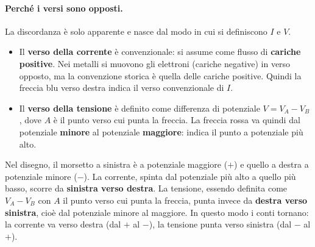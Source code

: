 \begin{figure}[htbp]
\centering
{}
\end{figure}

\paragraph{Perché i versi sono opposti.}
La discordanza è solo apparente e nasce dal modo in cui si definiscono \(I\) e \(V\).

\begin{itemize}[leftmargin=0.5cm]
  \item Il \textbf{verso della corrente} è convenzionale: si assume come flusso di \textbf{cariche positive}. Nei metalli si muovono gli elettroni (cariche negative) in verso opposto, ma la convenzione storica è quella delle cariche positive. Quindi la freccia blu verso destra indica il verso convenzionale di \(I\).
  \item Il \textbf{verso della tensione} è definito come differenza di potenziale \(V = V_A - V_B\), dove \(A\) è il punto verso cui punta la freccia. La freccia rossa va quindi dal potenziale \textbf{minore} al potenziale \textbf{maggiore}: indica il punto a potenziale più alto.
\end{itemize}

Nel disegno, il morsetto a sinistra è a potenziale maggiore (\(+\)) e quello a destra a potenziale minore (\(-\)). La corrente, spinta dal potenziale più alto a quello più basso, scorre da \textbf{sinistra verso destra}. La tensione, essendo definita come \(V_A - V_B\) con \(A\) il punto verso cui punta la freccia, punta invece da \textbf{destra verso sinistra}, cioè dal potenziale minore al maggiore. In questo modo i conti tornano: la corrente va verso destra (dal \(+\) al \(-\)), la tensione punta verso sinistra (dal \(-\) al \(+\)).


















